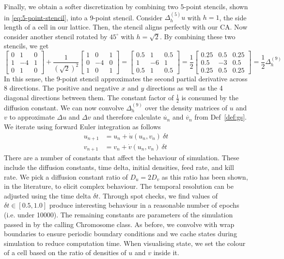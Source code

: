 Finally, we obtain a softer discretization by combining two 5-point stencils, shown in \ref{eq:5-point-stencil}, into a 9-point stencil. Consider $\Delta^{(5)}_h u$ with $h = 1$, the side length of a cell in our lattice. Then, the stencil aligns perfectly with our CA. Now consider another stencil rotated by $45^\circ$ with $h=\sqrt{2}$. By combining these two stencils, we get
\begin{equation}
  \begin{bmatrix}
    0 & 1 & 0\\
    1 & -4 & 1\\
    0 & 1 & 0
  \end{bmatrix}
  + \frac{1}{(\sqrt{2})^2}
  \begin{bmatrix}
    1 & 0 & 1\\
    0 & -4 & 0\\
    1 & 0 & 1
  \end{bmatrix}
  = 
  \begin{bmatrix}
    0.5 & 1 & 0.5\\
    1 & -6 & 1\\
    0.5 & 1 & 0.5
  \end{bmatrix}
  = \frac{1}{2}
  \begin{bmatrix}
    0.25 & 0.5 & 0.25\\
    0.5 & -3 & 0.5\\
    0.25 & 0.5 & 0.25
  \end{bmatrix}
  = \frac{1}{2} \Delta^{(9)}_h 
\end{equation}
In this sense, the 9-point stencil approximates the second partial derivative across 8 directions. The positive and negative $x$ and $y$ directions as well as the 4 diagonal directions between them. The constant factor of $\frac{1}{2}$ is consumed by the diffusion constant. We can now convolve $\Delta^{(9)}_h$ over the density matrices of $u$ and $v$ to approximate $\Delta u$ and $\Delta v$ and therefore calculate $\dot{u_n}$ and $\dot{v_n}$ from Def~\ref{def:gs}. We iterate using forward Euler integration as follows
\begin{align}
    u_{n+1} &= u_n + \dot{u}(u_n, v_n)\ \delta t\\
    v_{n+1} &= v_n + \dot{v}(u_n, v_n)\ \delta t
\end{align}
There are a number of constants that affect the behaviour of simulation. These include the diffusion constants, time delta, initial densities, feed rate, and kill rate. We pick a diffusion constant ratio of $D_u = 2D_v$ as this ratio has been shown, in the literature, to elicit complex behaviour\cite{compeau}. The temporal resolution can be adjusted using the time delta $\delta t$. Through spot checks, we find values of $\delta t \in [0.5, 1.0]$ produce interesting behaviour in a reasonable number of epochs (i.e. under 10000). The remaining constants are parameters of the simulation passed in by the calling Chromosome class. As before, we convolve with wrap boundaries to ensure periodic boundary conditions and we cache states during simulation to reduce computation time. When visualising state, we set the colour of a cell based on the ratio of densities of $u$ and $v$ inside it.\\

